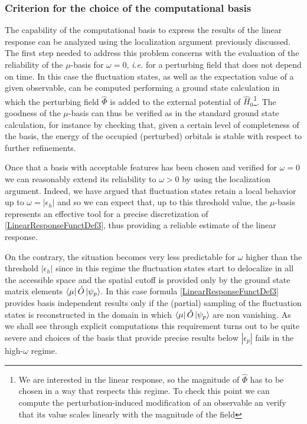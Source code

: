 \documentclass[a4paper]{article}
\newcommand{\eps}{\epsilon}
\newcommand{\op}[1]{\hat {#1}}
\newcommand{\hnot}{\op{H}_0}
\begin{document}
\subsubsection{Criterion for the choice of the computational basis} %

The capability of the computational basis to express the results of the linear response can be analyzed using the localization argument previously discussed. 
The first step needed to address this problem concerns with the evaluation of the reliability of the $\mu$-basis for $\omega=0$, \emph{i.e.} for a perturbing field that does 
not depend on time. In this case the fluctuation states, as well as the expectation value of a given observable, can be computed performing a ground state calculation in which the perturbing 
field $\op\Phi$ is added to the external potential of $\hnot$\footnote{We are interested in the linear response, so the magnitude of $\op\Phi$ has to be chosen in a way that respects this 
regime. To check this point we can compute the perturbation-induced modification of an observable an verify that its value scales linearly with the magnitude of the field}. 
The goodness of the $\mu$-basis can thus be verified as in the standard ground state calculation, for instance by checking that, given a certain level of completeness of the basis,
the energy of the occupied (perturbed) orbitals is stable with respect to further refinements. 

Once that a basis with acceptable features has been chosen and verified for $\omega=0$ we can reasonably extend its reliability to $\omega>0$ by using the localization argument. 
Indeed, we have argued that fluctuation states retain a local behavior up to $\omega=|\eps_h|$ and so we can expect that, up to this threshold value, the $\mu$-basis represents an 
effective tool for a precise discretization of \eqref{LinearResponseFunctDef3}, thus providing a reliable estimate of the linear response.  

On the contrary, the situation becomes very less predictable for $\omega$ higher than the threshold $|\eps_h|$ since in this regime the fluctuation states start to delocalize in all the 
accessible space and the spatial cutoff is provided only by the ground state matrix elements $\bra{\mu}\op O\ket{\psi_p}$.  
In this case formula \eqref{LinearResponseFunctDef3} provides basis independent results only if the (partial) sampling of the fluctuation states is reconstructed in the domain in which
$\bra{\mu}\op O\ket{\psi_p}$ are non vanishing. As we shall see through explicit computations this requirement turns out to be quite severe and choices of the basis that provide precise
results below $|\eps_p|$ fails in the high-$\omega$ regime.  
\end{document}
